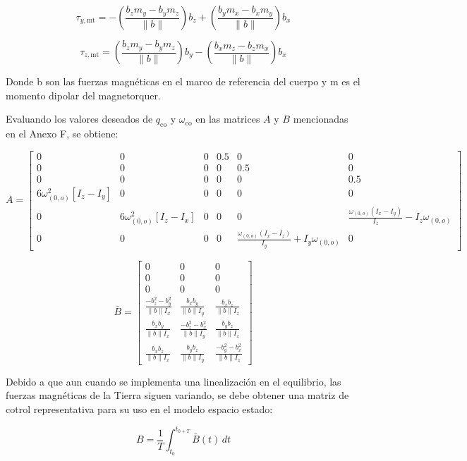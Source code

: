 \begin{equation}
	\tau_{y,\text{mt}} = -\left( \frac{b_z m_y - b_y m_z}{\|b\|} \right) b_z + \left( \frac{b_y m_x - b_x m_y}{\|b\|} \right) b_x
	\label{eq:MT_y}
\end{equation}

\begin{equation}
	\tau_{z,\text{mt}} = \left( \frac{b_z m_y - b_y m_z}{\|b\|} \right) b_y - \left( \frac{b_x m_z - b_z m_x}{\|b\|} \right) b_x
	\label{eq:MT_z}
\end{equation}

Donde b son las fuerzas magnéticas en el marco de referencia del cuerpo y m es el momento dipolar del magnetorquer.

Evaluando los valores deseados de $q_{\text{co}}$ y $\omega_{\text{co}}$ en las matrices $A$ y $B$ mencionadas en el Anexo F, se obtiene:

\[
	A = \begin{bmatrix}
		0 & 0 & 0 & 0.5 & 0 & 0 \\
		0 & 0 & 0 & 0 & 0.5 & 0 \\
		0 & 0 & 0 & 0 & 0 & 0.5 \\
		6\omega_{(0,o)}^2 [I_z - I_y] & 0 & 0 & 0 & 0 & 0 \\
		0 & 6\omega_{(0,o)}^2 [I_z - I_x] & 0 & 0 & 0 & \frac{\omega_{(0,o)} (I_x - I_y)}{I_z} - I_z \omega_{(0,o)} \\
		0 & 0 & 0 & 0 & \frac{\omega_{(0,o)} (I_x - I_z)}{I_y} + I_y \omega_{(0,o)} & 0
	\end{bmatrix}
\]

\[
	\bar{B} = \begin{bmatrix}
		0 & 0 & 0 \\
		0 & 0 & 0 \\
		0 & 0 & 0 \\
		\frac{-b_z^2 - b_y^2}{\|b\| I_x} & \frac{b_x b_y}{\|b\| I_y} & \frac{b_x b_z}{\|b\| I_z} \\
		\frac{b_x b_y}{\|b\| I_x} & \frac{-b_z^2 - b_x^2}{\|b\| I_y} & \frac{b_y b_z}{\|b\| I_z} \\
		\frac{b_x b_z}{\|b\| I_x} & \frac{b_y b_z}{\|b\| I_y} & \frac{-b_y^2 - b_x^2}{\|b\| I_z}
	\end{bmatrix}
\]

Debido a que aun cuando se implementa una linealización en el equilibrio, las fuerzas magnéticas de la Tierra siguen variando, se debe obtener una matriz de cotrol representativa para su uso en el modelo espacio estado:

\[
	B = \frac{1}{T} \int_{t_0}^{t_{0+T}} \bar{B}(t) \, dt
\]

